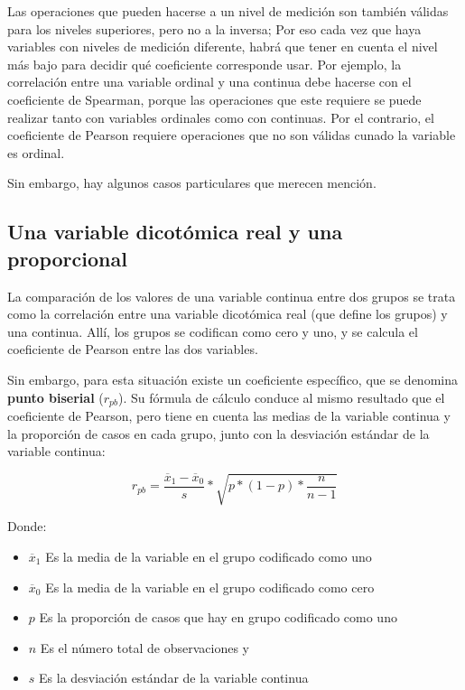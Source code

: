 \documentclass[]{book}
\begin{document}
Las operaciones que pueden hacerse a un nivel de medición
son también válidas para los niveles superiores, pero no a la inversa; Por eso cada vez que haya variables con niveles de medición diferente, habrá que tener en cuenta el nivel más bajo para decidir qué coeficiente corresponde usar. Por ejemplo, la correlación entre una variable ordinal y una continua debe hacerse con el coeficiente de Spearman, porque las operaciones que este requiere se puede realizar tanto con variables ordinales como con continuas. Por el contrario, el coeficiente de Pearson requiere operaciones que no son válidas cunado la variable es ordinal.

Sin embargo, hay algunos casos particulares que merecen mención.

\hypertarget{una-variable-dicotomica-real-y-una-proporcional}{%
\subsection{Una variable dicotómica real y una proporcional}\label{una-variable-dicotomica-real-y-una-proporcional}}

La comparación de los valores de una variable continua entre dos grupos se trata como la correlación entre una variable dicotómica real (que define los grupos) y una continua. Allí, los grupos se codifican como cero y uno, y se calcula el coeficiente de Pearson entre las dos variables.

Sin embargo, para esta situación existe un coeficiente específico, que se denomina \textbf{punto biserial} (\(r_{pb}\)). Su fórmula de cálculo conduce al mismo resultado que el coeficiente de Pearson, pero tiene en cuenta las medias de la variable continua y la proporción de casos en cada grupo, junto con la desviación estándar de la variable continua:

\[r_{pb} = \frac{{\overline{x}}_{1} - {\overline{x}}_{0}}{s}*\sqrt{p*(1 - p)*\frac{n}{n - 1}}\]

Donde:

\begin{itemize}
\item
  \({\overline{x}}_{1}\) Es la media de la variable en el grupo codificado como uno
\item
  \({\overline{x}}_{0}\) Es la media de la variable en el grupo codificado como cero
\item
  \(p\) Es la proporción de casos que hay en grupo codificado como uno
\item
  \(n\) Es el número total de observaciones y
\item
  \(s\) Es la desviación estándar de la variable continua
\end{itemize}
\end{document}
